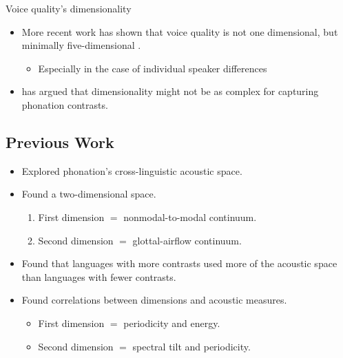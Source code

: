 \documentclass{beamer}
\begin{document}
\begin{frame}{Voice quality's dimensionality}
  \begin{itemize}
    \item More recent work has shown that voice quality is not one dimensional, but minimally five-dimensional \citep[e.g.,][]{garellekModelingVoiceSource2016,kreimanValidatingPsychoacousticModel2021}.
    \begin{itemize}
      \item Especially in the case of individual speaker differences
    \end{itemize}
    \item \citet{garellekVoiceQualityTone2013} has argued that dimensionality might not be as complex for capturing phonation contrasts.
  \end{itemize}
\end{frame}


\subsection{Previous Work}
\begin{frame}{\citet{keatingCrosslanguageAcousticSpace2023}}
  \begin{itemize}
    \item Explored phonation's cross-linguistic acoustic space.
    \item Found a two-dimensional space.
    \begin{enumerate}
      \item First dimension $=$ nonmodal-to-modal continuum.
      \item Second dimension $=$ glottal-airflow continuum.
    \end{enumerate}
    \item Found that languages with more contrasts used more of the acoustic space than languages with fewer contrasts.
    \item Found correlations between dimensions and acoustic measures.
    \begin{itemize}
      \item First dimension $=$ periodicity and energy.
      \item Second dimension $=$ spectral tilt and periodicity.
    \end{itemize}
  \end{itemize}
\end{frame}
\end{document}
